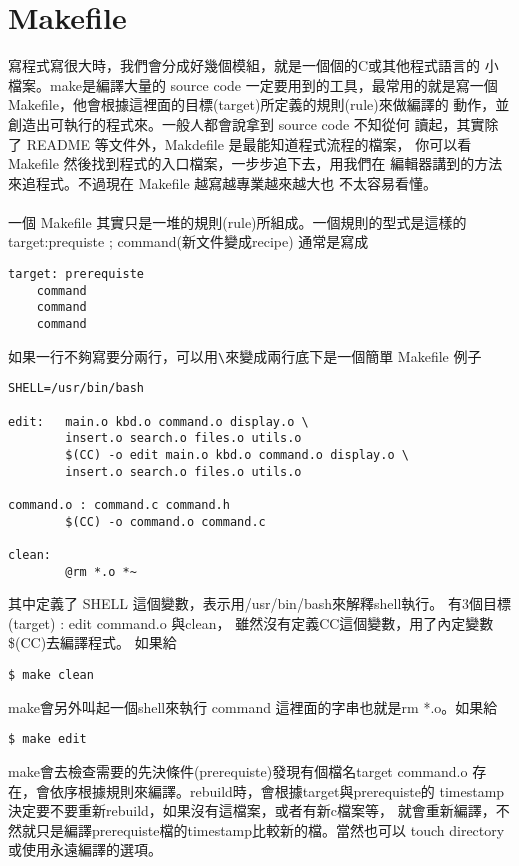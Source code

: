 \section{Makefile}
寫程式寫很大時，我們會分成好幾個模組，就是一個個的C或其他程式語言的
小檔案。make是編譯大量的 source code 一定要用到的工具，最常用的就是寫一個
Makefile，他會根據這裡面的目標(target)所定義的規則(rule)來做編譯的
動作，並創造出可執行的程式來。一般人都會說拿到 source code 不知從何
讀起，其實除了 README 等文件外，Makdefile 是最能知道程式流程的檔案，
你可以看 Makefile 然後找到程式的入口檔案，一步步追下去，用我們在
編輯器講到的方法來追程式。不過現在 Makefile 越寫越專業越來越大也
不太容易看懂。
\\\\
一個 Makefile 其實只是一堆的規則(rule)所組成。一個規則的型式是這樣的
target:prequiste ; command(新文件變成recipe) 通常是寫成
\begin{verbatim} 
target: prerequiste
	command
	command
	command
\end{verbatim} 
如果一行不夠寫要分兩行，可以用\verb=\=來變成兩行底下是一個簡單 Makefile 例子
\begin{verbatim}
SHELL=/usr/bin/bash

edit:	main.o kbd.o command.o display.o \
        insert.o search.o files.o utils.o
        $(CC) -o edit main.o kbd.o command.o display.o \
        insert.o search.o files.o utils.o
      
command.o : command.c command.h
        $(CC) -o command.o command.c

clean:
        @rm *.o *~
\end{verbatim}
其中定義了 SHELL 這個變數，表示用/usr/bin/bash來解釋shell執行。
有3個目標 (target) : edit command.o 與clean，
雖然沒有定義CC這個變數，用了內定變數\$(CC)去編譯程式。
如果給
\begin{verbatim}
$ make clean
\end{verbatim}
make會另外叫起一個shell來執行 command 這裡面的字串也就是rm *.o。如果給
\begin{verbatim}
$ make edit
\end{verbatim}
make會去檢查需要的先決條件(prerequiste)發現有個檔名target command.o 
存在，會依序根據規則來編譯。rebuild時，會根據target與prerequiste的
timestamp 決定要不要重新rebuild，如果沒有這檔案，或者有新c檔案等，
就會重新編譯，不然就只是編譯prerequiste檔的timestamp比較新的檔。當然也可以
touch directory或使用永遠編譯的選項。
